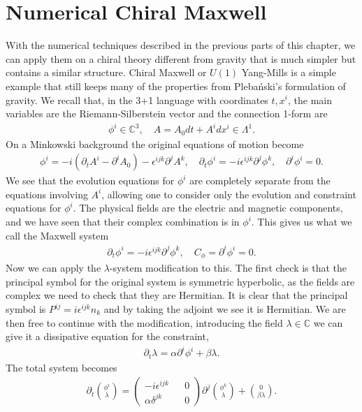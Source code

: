 \documentclass[10pt]{report}
\newcommand{\pleb}[0]{Pleba\'nski}
\theoremstyle{definition}
\newcommand{\C}[0]{\mathbb{C}}
\begin{document}
\section{Numerical Chiral Maxwell} \label{sec:numerical-chiral-maxwell}
With the numerical techniques described in the previous parts of this chapter, we can apply them on a chiral theory different from gravity that is much simpler but contains a similar structure. Chiral Maxwell or $U(1)$ Yang-Mills is a simple example that still keeps many of the properties from \pleb{}'s formulation of gravity. We recall that, in the 3+1 language with coordinates $t,x^i$, the main variables are the Riemann-Silberstein vector and the connection 1-form are
\begin{align}
    \phi^i \in \C^3, \quad A = A_0 dt + A^i dx^i \in \Lambda^1.
\end{align}
On a Minkowski background the original equations of motion become
\begin{align}
    \phi^i = -i(\partial_t A^i - \partial^i A_0) - \epsilon^{ijk} \partial^j A^k, \quad \partial_t \phi^i = -i \epsilon^{ijk} \partial^j \phi^k, \quad \partial^i \phi^i = 0.
\end{align}
We see that the evolution equations for $\phi^i$ are completely separate from the equations involving $A^i$, allowing one to consider only the evolution and constraint equations for $\phi^i$. The physical fields are the electric and magnetic components, and we have seen that their complex combination is in $\phi^i$. This gives us what we call the Maxwell system
\begin{align}
    \partial_t \phi^i = -i\epsilon^{ijk} \partial^j \phi^k, \quad C_\phi = \partial^i \phi^i = 0.
\end{align}
Now we can apply the $\lambda$-system modification to this. The first check is that the principal symbol for the original system is symmetric hyperbolic, as the fields are complex we need to check that they are Hermitian. It is clear that the principal symbol is $P^{ij} = i \epsilon^{ijk}n_k$ and by taking the adjoint we see it is Hermitian. We are then free to continue with the modification, introducing the field $\lambda \in \C$ we can give it a dissipative equation for the constraint,
\begin{align}
    \partial_t \lambda = \alpha \partial^i \phi^i + \beta \lambda.
\end{align}
The total system becomes
\begin{align}
    \partial_t \binom{\phi^i}{\lambda} = \begin{pmatrix}
        -i \epsilon^{ijk} && 0 \\ \alpha \delta^{jk} && 0
    \end{pmatrix} \partial^j \binom{\phi^k}{\lambda} + \binom{0}{\beta \lambda}.
\end{align}
\end{document}
